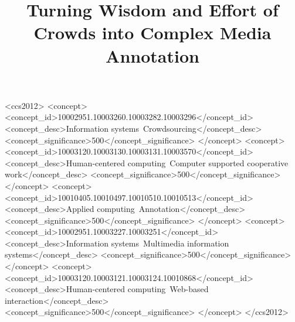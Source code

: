 \documentclass[sigconf]{acmart}
\begin{document}
\title{Turning Wisdom and Effort of Crowds into Complex Media  Annotation}








\begin{abstract}
	
\end{abstract}

\begin{CCSXML}
<ccs2012>
<concept>
<concept_id>10002951.10003260.10003282.10003296</concept_id>
<concept_desc>Information systems~Crowdsourcing</concept_desc>
<concept_significance>500</concept_significance>
</concept>
<concept>
<concept_id>10003120.10003130.10003131.10003570</concept_id>
<concept_desc>Human-centered computing~Computer supported cooperative work</concept_desc>
<concept_significance>500</concept_significance>
</concept>
<concept>
<concept_id>10010405.10010497.10010510.10010513</concept_id>
<concept_desc>Applied computing~Annotation</concept_desc>
<concept_significance>500</concept_significance>
</concept>
<concept>
<concept_id>10002951.10003227.10003251</concept_id>
<concept_desc>Information systems~Multimedia information systems</concept_desc>
<concept_significance>500</concept_significance>
</concept>
<concept>
<concept_id>10003120.10003121.10003124.10010868</concept_id>
<concept_desc>Human-centered computing~Web-based interaction</concept_desc>
<concept_significance>500</concept_significance>
</concept>
</ccs2012>
\end{CCSXML}



\end{document}

